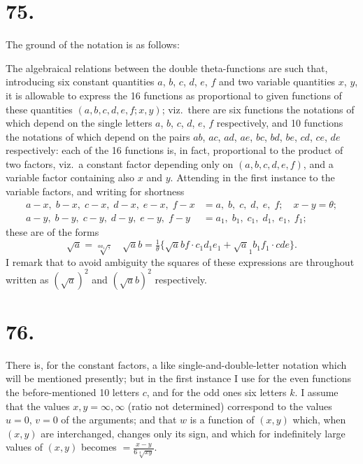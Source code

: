\documentclass[11pt,a4paper]{book}
\begin{document}
\section*{75.}
\label{sec:75}

The ground of the notation is as follows:

The algebraical relations between the double theta-functions are such that, introducing six constant quantities $a$, $b$, $c$, $d$, $e$, $f$ and two variable quantities $x$, $y$, it is allowable to express the 16 functions as proportional to given functions of these quantities $(a,b,c,d,e,f; x,y)$; viz.\ there are six functions the notations of which depend on the single letters $a$, $b$, $c$, $d$, $e$, $f$ respectively, and 10 functions the notations of which depend on the pairs $ab$, $ac$, $ad$, $ae$, $bc$, $bd$, $be$, $cd$, $ce$, $de$ respectively: each of the 16 functions is, in fact, proportional to the product of two factors, viz.\ a constant factor depending only on $(a,b,c,d,e,f)$, and a variable factor containing also $x$ and $y$. Attending in the first instance to the variable factors, and writing for shortness
\begin{align*}
a-x,\; b-x,\; c-x,\; d-x,\; e-x,\; f-x &= a,\; b,\; c,\; d,\; e,\; f;\quad x-y=\theta; \\
a-y,\; b-y,\; c-y,\; d-y,\; e-y,\; f-y &= a_1,\; b_1,\; c_1,\; d_1,\; e_1,\; f_1;
\end{align*}
these are of the forms
\[
\surd a = \surd[aa_1], \quad \surd ab = \tfrac{1}{\theta}\{\surd abf \cdot c_1d_1e_1 + \surd a_1b_1f_1 \cdot cde\}.
\]
I remark that to avoid ambiguity the squares of these expressions are throughout written as $(\surd a)^2$ and $(\surd ab)^2$ respectively.

\section*{76.}
\label{sec:76}

There is, for the constant factors, a like single-and-double-letter notation which will be mentioned presently; but in the first instance I use for the even functions the before-mentioned 10 letters $c$, and for the odd ones six letters $k$. I assume that the values $x,y = \infty, \infty$ (ratio not determined) correspond to the values $u=0$, $v=0$ of the arguments; and that $w$ is a function of $(x,y)$ which, when $(x,y)$ are interchanged, changes only its sign, and which for indefinitely large values of $(x,y)$ becomes $=\frac{x-y}{6\sqrt[4]{xy}}$.
\end{document}
